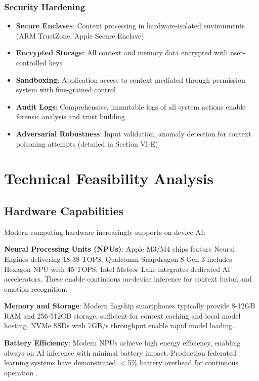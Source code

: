 \documentclass[conference]{IEEEtran}
\begin{document}
\subsubsection{Security Hardening}

\begin{itemize}
\item \textbf{Secure Enclaves}: Context processing in hardware-isolated environments (ARM TrustZone, Apple Secure Enclave)
\item \textbf{Encrypted Storage}: All context and memory data encrypted with user-controlled keys
\item \textbf{Sandboxing}: Application access to context mediated through permission system with fine-grained control
\item \textbf{Audit Logs}: Comprehensive, immutable logs of all system actions enable forensic analysis and trust building
\item \textbf{Adversarial Robustness}: Input validation, anomaly detection for context poisoning attempts (detailed in Section VI-E)
\end{itemize}

\section{Technical Feasibility Analysis}

\subsection{Hardware Capabilities}

Modern computing hardware increasingly supports on-device AI:

\textbf{Neural Processing Units (NPUs)}: Apple M3/M4 chips feature Neural Engines delivering 18-38 TOPS; Qualcomm Snapdragon 8 Gen 3 includes Hexagon NPU with 45 TOPS; Intel Meteor Lake integrates dedicated AI accelerators. These enable continuous on-device inference for context fusion and emotion recognition.

\textbf{Memory and Storage}: Modern flagship smartphones typically provide 8-12GB RAM and 256-512GB storage, sufficient for context caching and local model hosting. NVMe SSDs with 7GB/s throughput enable rapid model loading.

\textbf{Battery Efficiency}: Modern NPUs achieve high energy efficiency, enabling always-on AI inference with minimal battery impact. Production federated learning systems have demonstrated $<$5\% battery overhead for continuous operation \cite{girgis2021shuffled}.
\end{document}
